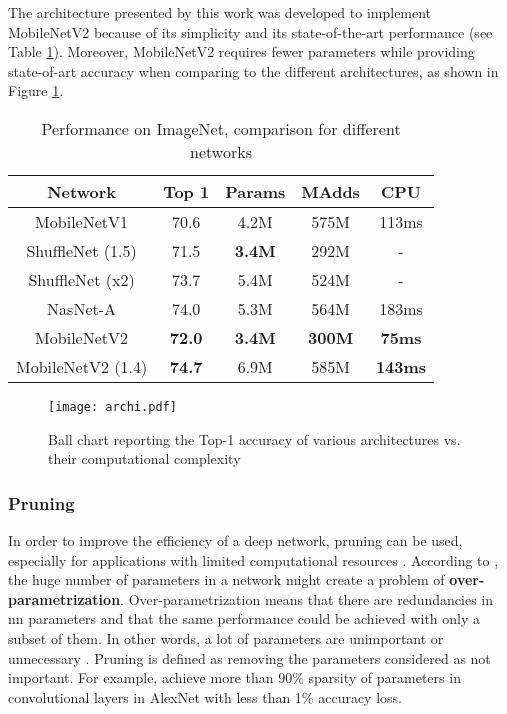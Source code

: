 The architecture presented by this work was developed to implement MobileNetV2 because of its simplicity and its state-of-the-art performance (see Table \ref{tab:mbv2}). Moreover, MobileNetV2 requires fewer parameters while providing state-of-art accuracy when comparing to the different architectures, as shown in Figure \ref{fig:archi}.
%
\begin{table}[H]
    \center
    \begin{tabular}{ | c | c | c c | c| }
        \hline \hline
        Network & Top 1 & Params & MAdds & CPU \\
        \hline \hline
        MobileNetV1 & 70.6 & 4.2M & 575M & 113ms \\
        ShuffleNet (1.5) & 71.5 & \textbf{3.4M} & 292M & - \\
        ShuffleNet (x2)  & 73.7 & 5.4M & 524M & - \\
        NasNet-A & 74.0 & 5.3M & 564M & 183ms \\
        \hline
        MobileNetV2 & \textbf{72.0} & \textbf{3.4M} & \textbf{300M} & \textbf{75ms} \\
        MobileNetV2 (1.4) & \textbf{74.7} & 6.9M & 585M & \textbf{143ms} \\
        \hline \hline
    \end{tabular}
    \caption{Performance on ImageNet, comparison for different networks \cite{sandler_mobilenetv2_2018}}
    \label{tab:mbv2}
\end{table}

\begin{figure}[H]
    \centering
    \texttt{[image: archi.pdf]}
    \caption{Ball chart reporting the Top-1 accuracy of various architectures vs. their computational complexity \cite{canziani_analysis_2017}}
    \label{fig:archi}
\end{figure}
%
\subsubsection{Pruning} \label{subs:pruning}
%
In order to improve the efficiency of a deep network, pruning can be used, especially for applications with limited computational resources \cite{liu_rethinking_2019}. According to \textcite{denton_exploiting_2014, liu_rethinking_2019}, the huge number of parameters in a network might create a problem of \textbf{over-parametrization}. Over-parametrization means that there are redundancies in \acrshort{nn} parameters and that the same performance could be achieved with only a subset of them. In other words, a lot of parameters are unimportant or unnecessary \cite{cheng_recent_2018}. Pruning is defined as removing the parameters considered as not important. For example, \textcite{baoyuan_liu_sparse_2015} achieve more than 90\% sparsity of parameters in convolutional layers in AlexNet with less than 1\% accuracy loss.

